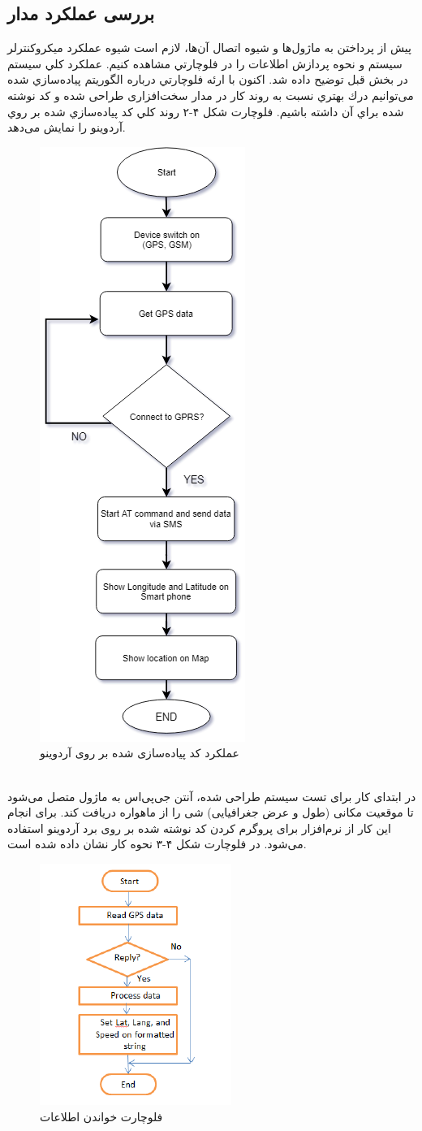 \subsection{بررسی عملکرد مدار}
پيش از پرداختن به ماژول‌ها و شيوه اتصال آن‌ها، لازم است شيوه عملكرد ميكروكنترلر سيستم و نحوه پردازش اطلاعات را در فلوچارتي مشاهده كنيم. عملكرد كلي سيستم در بخش قبل توضيح داده شد. اكنون با ارئه فلوچارتي درباره الگوريتم پياده‌سازي شده می‌توانیم درك بهتري نسبت به روند كار در مدار سخت‌افزاری طراحی شده و كد نوشته شده براي آن داشته باشيم.
فلوچارت شكل ۴-۲ روند كلي كد پياده‌سازي شده بر روي آردوینو را نمايش می‌دهد.
\begin{figure}[h!]
	\centering
	\includegraphics[width=.2\textwidth]{tracking-flowchart}
	\caption{عملکرد کد پیاده‌سازی شده بر روی آردوینو \cite{Rahman2016,Alshamsi,Hazza}}
\end{figure}
\\
در ابتدای کار برای تست سیستم طراحی شده، آنتن جی‌پی‌اس به ماژول  متصل می‌شود تا موقعیت مکانی (طول و عرض جغرافیایی) شی را از ماهواره دریافت کند. برای انجام این کار از نرم‌افزار  برای پروگرم کردن کد نوشته شده بر روی برد آردوینو استفاده می‌شود.
در فلوچارت شکل ۴-۳ نحوه کار  نشان داده شده است.
\begin{figure}[!h]
	\centerline{\includegraphics[width=.3\textwidth]{gps-flowchart}}
	\caption{فلوچارت خواندن اطلاعات  \cite{ElShafee2013}}
\end{figure}


